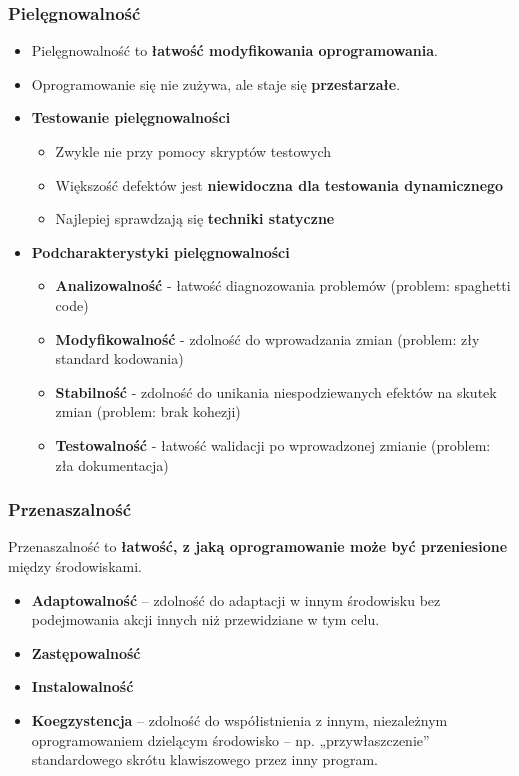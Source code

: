 \documentclass[../main.tex]{subfiles}
\begin{document}
    \subsubsection{Pielęgnowalność}
    \begin{itemize}
        \item Pielęgnowalność to \textbf{łatwość modyfikowania oprogramowania}.
        \item Oprogramowanie się nie zużywa, ale staje się \textbf{przestarzałe}.
        \item \textbf{Testowanie pielęgnowalności}
        \begin{itemize}
            \item Zwykle nie przy pomocy skryptów testowych
            \item Większość defektów jest \textbf{niewidoczna dla testowania dynamicznego}
            \item Najlepiej sprawdzają się \textbf{techniki statyczne}
        \end{itemize}
        \item \textbf{Podcharakterystyki pielęgnowalności}
        \begin{itemize}
            \item \textbf{Analizowalność} - łatwość diagnozowania problemów (problem: spaghetti code)
            \item \textbf{Modyfikowalność} - zdolność do wprowadzania zmian (problem: zły standard kodowania)
            \item \textbf{Stabilność} - zdolność do unikania niespodziewanych efektów na skutek zmian (problem: brak kohezji)
            \item \textbf{Testowalność} - łatwość walidacji po wprowadzonej zmianie (problem: zła dokumentacja)
        \end{itemize}
    \end{itemize}


    \subsubsection{Przenaszalność}
    Przenaszalność to \textbf{łatwość, z jaką oprogramowanie może być przeniesione} między środowiskami.
    \begin{itemize}
        \item \textbf{Adaptowalność} – zdolność do adaptacji w innym środowisku bez
        podejmowania akcji innych niż przewidziane w tym celu.
        \item \textbf{Zastępowalność}
        \item \textbf{Instalowalność}
        \item \textbf{Koegzystencja} – zdolność do współistnienia z innym, niezależnym oprogramowaniem dzielącym środowisko
        – np. „przywłaszczenie” standardowego skrótu klawiszowego przez inny program.
    \end{itemize}
\end{document}
